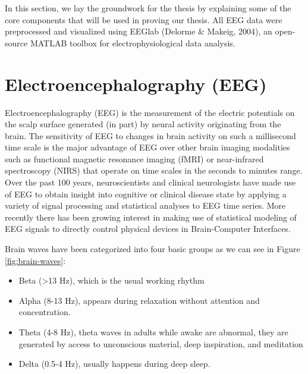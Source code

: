 \documentclass[12pt,a4paper,titlepage,openany]{report}
\begin{document}
In this section, we lay the groundwork for the thesis by explaining some of the core components that will be used in proving our thesis.
All EEG data were preprocessed and visualized using EEGlab (Delorme \& Makeig, 2004), an open-source MATLAB toolbox for electrophysiological data analysis.

\section{Electroencephalography (EEG)}

Electroencephalography (EEG) \cite{wikipediaEEG} is the measurement of the electric potentials on the scalp surface generated (in part) by neural activity originating from the brain. 
The sensitivity of EEG to changes in brain activity on such a millisecond time scale is the major advantage of EEG over other brain imaging modalities such as functional magnetic resonance imaging (fMRI) or near-infrared spectroscopy (NIRS) that operate on time scales in the seconds to minutes range. 
Over the past 100 years, neuroscientists and clinical neurologists have made use of EEG to obtain insight into cognitive or clinical disease state by applying a variety of signal processing and statistical analyses to EEG time series. 
More recently there has been growing interest in making use of statistical modeling of EEG signals to directly control physical devices in Brain-Computer Interfaces\cite{nunez2016}.

Brain waves have been categorized into four basic groups \cite{teplan2002} as we can see in Figure \ref{fig:brain-waves}: 
\begin{itemize}
    \item Beta (\textgreater13 Hz), which is the usual working rhythm
    \item Alpha (8-13 Hz), appears during relaxation without attention and concentration.
    \item Theta (4-8 Hz), theta waves in adults while awake are abnormal, they are generated by access to unconscious material, deep inspiration, and meditation 
    \item Delta (0.5-4 Hz), usually happens during deep sleep\cite{khalifa2012}.
\end{itemize}
\end{document}
